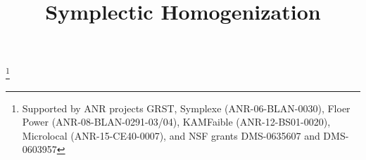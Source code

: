 \documentclass[JEP,XML,SOM,NoFloatCountersInSection,Unicode,published]{cedram}
\numberwithin{equation}{section}
\theoremstyle{plain}
\theoremstyle{definition}
\theoremstyle{remark}
\begin{document}
\frontmatter
\title{Symplectic Homogenization}

\author[\initial{C.} \lastname{Viterbo}]{ }
\address{DMA, UMR 8553 du CNRS, École Normale Supérieure, PSL University\\
45 Rue d'Ulm, 75230 Paris Cedex 05, France}
\urladdr{}

\thanks{Supported by ANR projects GRST, Symplexe (ANR-06-BLAN-0030), Floer Power (ANR-08-BLAN-0291-03/04), KAMFaible (ANR-12-BS01-0020), Microlocal (ANR-15-CE40-0007), and NSF grants DMS-0635607 and DMS-0603957}

\end{document}
